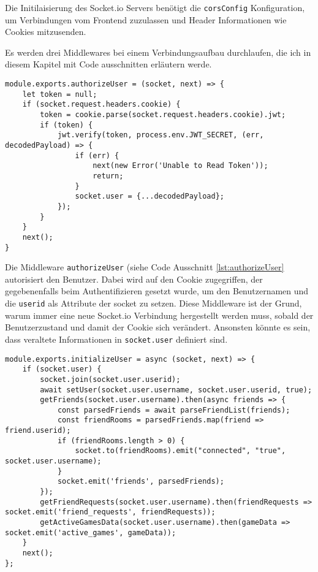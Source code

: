 Die Initilaisierung des Socket.io Servers benötigt die \verb|corsConfig| Konfiguration, um Verbindungen vom Frontend zuzulassen und Header Informationen wie Cookies mitzusenden.

Es werden drei Middlewares bei einem Verbindungsaufbau durchlaufen,  die ich in diesem Kapitel mit Code ausschnitten erläutern werde.


\begin{lstlisting}[style=codeStyle, caption={authorizeUser Middleware für Socket.io Verbinudngen}, label={lst:authorizeUser}]
module.exports.authorizeUser = (socket, next) => {
    let token = null;
    if (socket.request.headers.cookie) {
        token = cookie.parse(socket.request.headers.cookie).jwt;
        if (token) {
            jwt.verify(token, process.env.JWT_SECRET, (err, decodedPayload) => {
                if (err) {
                    next(new Error('Unable to Read Token'));
                    return;
                }
                socket.user = {...decodedPayload};
            });
        }
    }
    next();
}
\end{lstlisting}

Die Middleware \verb|authorizeUser| (siehe Code Ausschnitt \ref{lst:authorizeUser} autorisiert den Benutzer. Dabei  wird auf den Cookie zugegriffen, der gegebenenfalls beim Authentifizieren gesetzt wurde, um den Benutzernamen und die \verb|userid| als Attribute der socket zu setzen. Diese Middleware ist der Grund, warum immer eine neue Socket.io Verbindung hergestellt werden muss, sobald der Benutzerzustand und damit der Cookie sich verändert. Ansonsten könnte es sein, dass veraltete Informationen in \verb|socket.user| definiert sind.

\begin{lstlisting}[style=codeStyle, caption={initializeUser Middleware für Socket.io Verbinudngen}, label={lst:initializeUser}]
module.exports.initializeUser = async (socket, next) => {
    if (socket.user) {
        socket.join(socket.user.userid);
        await setUser(socket.user.username, socket.user.userid, true);
        getFriends(socket.user.username).then(async friends => {
            const parsedFriends = await parseFriendList(friends);
            const friendRooms = parsedFriends.map(friend => friend.userid);
            if (friendRooms.length > 0) {
                socket.to(friendRooms).emit("connected", "true", socket.user.username);
            }
            socket.emit('friends', parsedFriends);
        });
        getFriendRequests(socket.user.username).then(friendRequests => socket.emit('friend_requests', friendRequests));
        getActiveGamesData(socket.user.username).then(gameData => socket.emit('active_games', gameData));
    }
    next();
};
\end{lstlisting}

